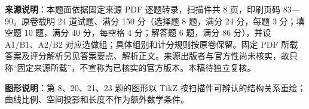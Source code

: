 


\begin{gktip}
\textbf{来源说明}：本题面依据固定来源 PDF 逐题转录，扫描件共 8 页，印刷页码 83—90。原卷载明 24 道试题、满分 150 分（选择题 8 题，满分 24 分，每题 3 分；填空题 10 题，满分 40 分，每空格 4 分；解答题 6 题，满分 86 分），并设 A1/B1、A2/B2 对应选做组；具体组别和计分规则按原卷保留。固定 PDF 所载答案及评分解析另见答案要点、解析正文。来源出版者与官方性尚未核实，故只称“固定来源所载”，不宣称为已核实的官方版本。本稿待独立复核。

\textbf{图形说明}：第 8、20、21、23 题的图形以 TikZ 按扫描件可辨认的结构关系重绘；曲线比例、空间投影和长度不作为额外数学条件。
\end{gktip}

